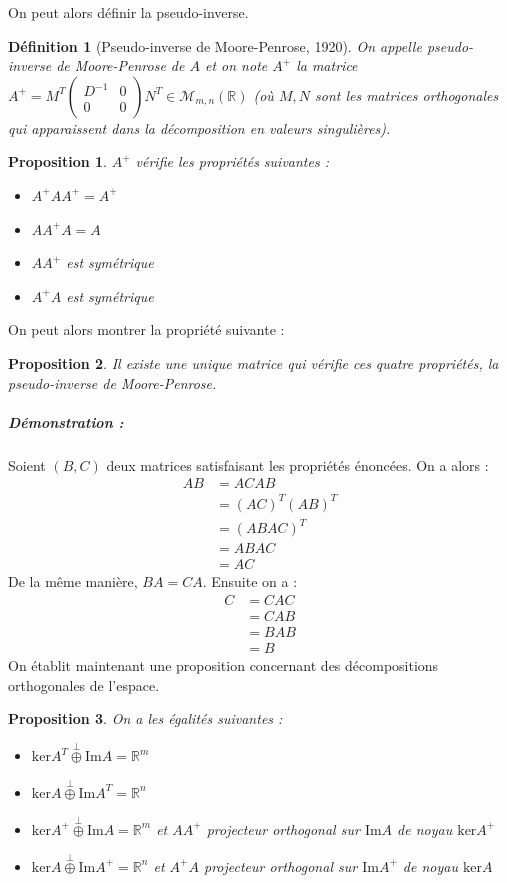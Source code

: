 \documentclass[10pt,a4paper]{article}
\newtheorem{mydef}{Définition}
\newtheorem{prop}{Proposition}
\begin{document}
On peut alors définir la pseudo-inverse.
\begin{mydef}[Pseudo-inverse de Moore-Penrose, 1920]
On appelle pseudo-inverse de Moore-Penrose de $A$ et on note $A^+$ la matrice $A^+=M^T \left( \begin{matrix}
D^{-1} & 0 \\ 0 & 0
\end{matrix}\right)N^T \in \mathcal{M}_{m,n}(\mathbb{R})$ (où $M, N$ sont les matrices orthogonales qui apparaissent dans la décomposition en valeurs singulières).
\end{mydef}
\begin{prop}
$A^+$ vérifie les propriétés suivantes :
\begin{itemize}
\item $A^+A A^+=A^+$
\item $A A^+ A =A$
\item $A A^+$ est symétrique
\item $A^+ A$ est symétrique
\end{itemize}
\end{prop}
On peut alors montrer la propriété suivante :
\begin{prop}
Il existe une unique matrice qui vérifie ces quatre propriétés, la pseudo-inverse de Moore-Penrose.
\end{prop}
\subparagraph{Démonstration :} Soient $(B,C)$ deux matrices satisfaisant les propriétés énoncées.
On a alors :
\begin{equation}
\begin{aligned}
AB&=ACAB \\
&=(AC)^T(AB)^T \\
&=(ABAC)^T \\
&=ABAC \\
&=AC
\end{aligned}
\end{equation}
De la même manière, $BA=CA$.
Ensuite on a :
\begin{equation}
\begin{aligned}
C&=CAC\\
&=CAB\\
&=BAB\\
&=B
\end{aligned}
\end{equation}
On établit maintenant une proposition concernant des décompositions orthogonales de l'espace.
\begin{prop}
On a les égalités suivantes :
\begin{itemize}
\item $\text{ker}A^T \overset{\perp}{\oplus} \text{Im}A = \mathbb{R}^m$
\item $\text{ker}A \overset{\perp}{\oplus} \text{Im}A^T = \mathbb{R}^n$
\item $\text{ker}A^+ \overset{\perp}{\oplus} \text{Im}A = \mathbb{R}^m$ et $AA^+$ projecteur orthogonal sur $\text{Im}A$ de noyau $\text{ker}A^+$
\item $\text{ker}A \overset{\perp}{\oplus} \text{Im}A^+ = \mathbb{R}^n$ et $A^+A$ projecteur orthogonal sur $\text{Im}A^+$ de noyau $\text{ker}A$
\end{itemize}
\end{prop}
\end{document}
